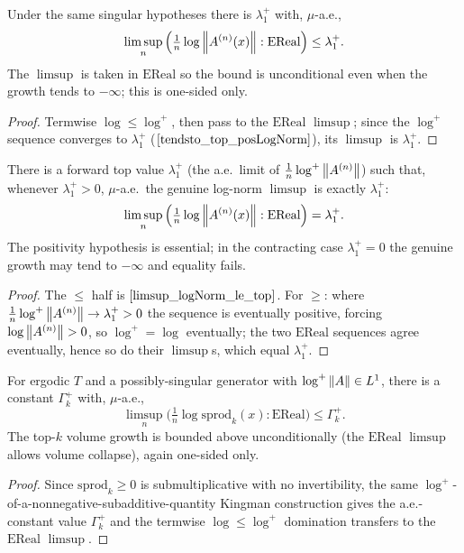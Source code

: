 \begin{theorem}\label{limsup_logNorm_le_top}
  \leanok
  Under the same singular hypotheses there is $\lambda_1^+$ with, $\mu$-a.e.,
  \[ \limsup_n\Big(\tfrac1n\log\left\lVert A^{(n)}(x) \right\rVert : \mathrm{EReal}\Big) \le \lambda_1^+. \]
  The $\limsup$ is taken in $\mathrm{EReal}$ so the bound is unconditional even when the growth tends to $-\infty$; this is one-sided only.
\end{theorem}
\begin{proof}\leanok
  Termwise $\log \le \log^+$, then pass to the $\mathrm{EReal}$ $\limsup$; since the $\log^+$ sequence converges to $\lambda_1^+$ ($\ref{tendsto_top_posLogNorm}$), its $\limsup$ is $\lambda_1^+$.
\end{proof}

\begin{theorem}\label{limsup_logNorm_eq_top_of_pos}
  \leanok
  There is a forward top value $\lambda_1^+$ (the a.e.\ limit of $\tfrac1n\log^+\left\lVert A^{(n)} \right\rVert$) such that, whenever $\lambda_1^+ > 0$, $\mu$-a.e.\ the genuine log-norm $\limsup$ is exactly $\lambda_1^+$:
  \[ \limsup_n\Big(\tfrac1n\log\left\lVert A^{(n)}(x) \right\rVert : \mathrm{EReal}\Big) = \lambda_1^+. \]
  The positivity hypothesis is essential; in the contracting case $\lambda_1^+ = 0$ the genuine growth may tend to $-\infty$ and equality fails.
\end{theorem}
\begin{proof}\leanok
  The $\le$ half is $\ref{limsup_logNorm_le_top}$. For $\ge$: where $\tfrac1n\log^+\left\lVert A^{(n)} \right\rVert \to \lambda_1^+ > 0$ the sequence is eventually positive, forcing $\log\left\lVert A^{(n)} \right\rVert > 0$, so $\log^+ = \log$ eventually; the two $\mathrm{EReal}$ sequences agree eventually, hence so do their $\limsup$s, which equal $\lambda_1^+$.
\end{proof}

\begin{theorem}\label{limsup_logSprod_le_top}
  \leanok
  For ergodic $T$ and a possibly-singular generator with $\log^+\left\lVert A \right\rVert \in L^1$, there is a constant $\Gamma_k^+$ with, $\mu$-a.e.,
  \[ \limsup_n\Big(\tfrac1n\log\mathrm{sprod}_k(x) : \mathrm{EReal}\Big) \le \Gamma_k^+. \]
  The top-$k$ volume growth is bounded above unconditionally (the $\mathrm{EReal}$ $\limsup$ allows volume collapse), again one-sided only.
\end{theorem}
\begin{proof}\leanok
  Since $\mathrm{sprod}_k \ge 0$ is submultiplicative with no invertibility, the same $\log^+$-of-a-nonnegative-subadditive-quantity Kingman construction gives the a.e.-constant value $\Gamma_k^+$ and the termwise $\log \le \log^+$ domination transfers to the $\mathrm{EReal}$ $\limsup$.
\end{proof}
